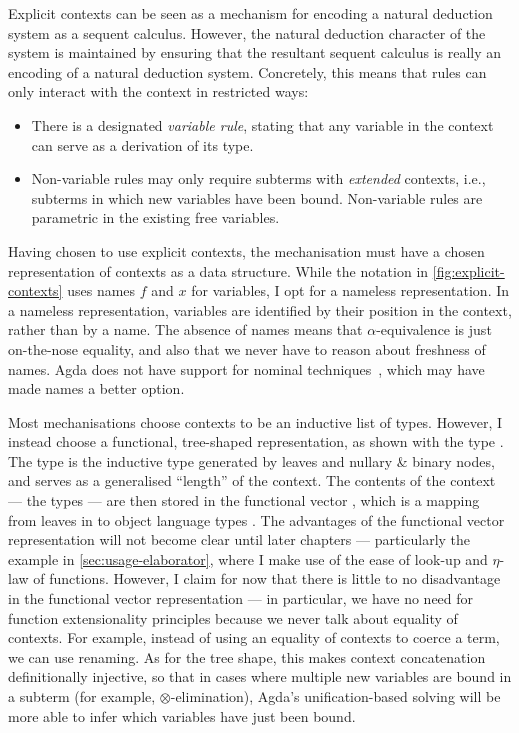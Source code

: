 Explicit contexts can be seen as a mechanism for encoding a natural deduction
system as a sequent calculus.
However, the natural deduction character of the system is maintained by
ensuring that the resultant sequent calculus is really an encoding of a
natural deduction system.
Concretely, this means that rules can only interact with the context in
restricted ways:

\begin{itemize}
  \item There is a designated \emph{variable rule}, stating that any variable
    in the context can serve as a derivation of its type.
  \item Non-variable rules may only require subterms with \emph{extended}
    contexts, i.e., subterms in which new variables have been bound.
    Non-variable rules are parametric in the existing free variables.
\end{itemize}

Having chosen to use explicit contexts, the mechanisation must have a chosen
representation of contexts as a data structure.
While the notation in \cref{fig:explicit-contexts} uses names $f$ and $x$
for variables, I opt for a nameless representation.
In a nameless representation, variables are identified by their position in
the context, rather than by a name.
The absence of names means that $\alpha$-equivalence is just on-the-nose
equality, and also that we never have to reason about freshness of names.
Agda does not have support for nominal techniques~\cite{GP02}, which may have
made names a better option.

Most mechanisations choose contexts to be an inductive list of types.
However, I instead choose a functional, tree-shaped representation, as shown
with the type .
The type  is the inductive type generated by leaves and
nullary \& binary nodes, and serves as a generalised ``length'' of the context.
The contents of the context --- the types --- are then stored in the functional
vector , which is a mapping from leaves in 
to object language types .
The advantages of the functional vector representation will not become clear
until later chapters --- particularly the example in
\cref{sec:usage-elaborator}, where I make use of the ease of look-up and
$\eta$-law of functions.
However, I claim for now that there is little to no disadvantage in the
functional vector representation --- in particular, we have no need for
function extensionality principles because we never talk about equality of
contexts.
For example, instead of using an equality of contexts to coerce a term, we can
use renaming.
As for the tree shape, this makes context concatenation definitionally
injective, so that in cases where multiple new variables are bound in a subterm
(for example, $\otimes$-elimination), Agda's unification-based solving will
be more able to infer which variables have just been bound.

